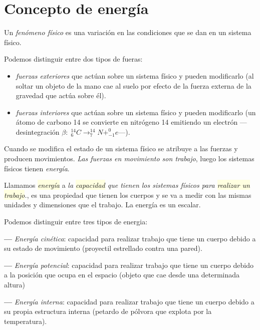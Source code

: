 \section{Concepto de energía}

\normalsize{Un} \emph{fenómeno físico} es una variación en las condiciones que se dan en un sistema físico.

Podemos distinguir entre dos tipos de fueras:

\vspace{-2mm}\begin{itemize}
\vspace{-2mm}\item \emph{fuerzas exteriores} que actúan sobre un sistema físico y pueden modificarlo (al soltar un objeto de la mano cae al suelo por efecto de la fuerza externa de la gravedad que actúa sobre él).
\vspace{-2mm}\item \emph{fuerzas interiores} que actúan sobre un sistema físico y pueden modificarlo 	(un átomo de carbono 14 se convierte en nitrógeno 14 emitiendo un electrón --- desintegración $\beta:\; ^{14}_6C \to ^{14}_7N+^0_{-1}e$---).
\end{itemize}

Cuando se modifica el estado de un sistema físico se atribuye a las fuerzas y producen movimientos. \emph{Las fuerzas en movimiento son trabajo}, luego los sistemas físicos tienen \emph{energía}. 

Llamamos \emph{\colorbox{LightYellow}{energía}} a \emph{la \colorbox{LightYellow}{capacidad} que tienen los sistemas físicos para \colorbox{LightYellow}{realizar un trabajo}.}, es una propiedad que tienen los cuerpos y se va a medir con las mismas unidades y dimensiones que el trabajo. La energía es un escalar.

Podemos distinguir entre tres tipos de energia:

\begin{miparrafo}

\textbf{---} \emph{Energía cinética}: capacidad para realizar trabajo que tiene un cuerpo debido a su estado de movimiento (proyectil estrellado contra una pared).

\textbf{---} \emph{Energía potencial}: capacidad para realizar trabajo que tiene un cuerpo debido a la posición que ocupa en el espacio  (objeto que cae desde una determinada altura)

\textbf{---} \emph{Energía interna}: capacidad para realizar trabajo que tiene un cuerpo debido a su propia estructura interna (petardo de pólvora que explota por la temperatura).

\end{miparrafo}

